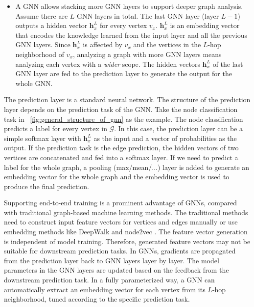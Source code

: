 \begin{itemize}
    \item   A GNN allows stacking more GNN layers to support deeper graph analysis.
    Assume there are $L$ GNN layers in total.
    The last GNN layer (layer $L-1$) outputs a hidden vector $\boldsymbol{h}^{L}_x$ for every vertex $v_x$.
    $\boldsymbol{h}^L_x$ is an embedding vector that encodes the knowledge learned from the input layer and all the previous GNN layers.
    Since $\boldsymbol{h}^L_x$ is affected by $v_x$ and the vertices in the $L$-hop neighborhood of $v_x$, analyzing a graph with more GNN layers means analyzing each vertex with a \emph{wider} scope.
    The hidden vectors $\boldsymbol{h}^L_x$ of the last GNN layer are fed to the prediction layer to generate the output for the whole GNN.
\end{itemize}

The prediction layer is a standard neural network.
%
The structure of the prediction layer depends on the prediction task of the GNN.
%
Take the node classification task in \figurename~\ref{fig:general_structure_of_gnn} as the example.
%
The node classification predicts a label for every vertex in $\mathcal{G}$.
%
In this case, the prediction layer can be a simple softmax layer with $\boldsymbol{h}^L_x$ as the input and a vector of probabilities as the output.
%
If the prediction task is the edge prediction, the hidden vectors of two vertices are concatenated and fed into a softmax layer.
%
If we need to predict a label for the whole graph, a pooling (max/mean/...) layer is added to generate an embedding vector for the whole graph and the embedding vector is used to produce the final prediction.

Supporting end-to-end training is a prominent advantage of GNNs, compared with traditional graph-based machine learning methods.
The traditional methods need to construct input feature vectors for vertices and edges manually or use embedding methods like DeepWalk \cite{bryan2014_deepwalk} and node2vec \cite{aditya2016_node2vec}.
The feature vector generation is independent of model training.
Therefore, generated feature vectors may not be suitable for downstream prediction tasks.
In GNNs, gradients are propagated from the prediction layer back to GNN layers layer by layer. 
The model parameters in the GNN layers are updated based on the feedback from the downstream prediction task. 
In a fully parameterized way, a GNN can automatically extract an embedding vector for each vertex from its $L$-hop neighborhood, tuned according to the specific prediction task.

